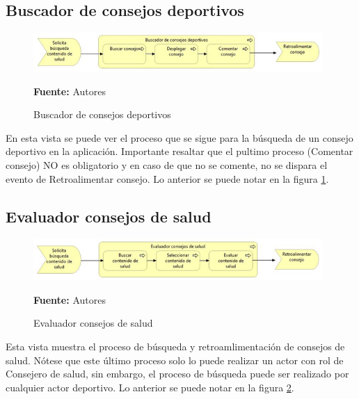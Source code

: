 \subsection{Buscador de consejos deportivos}

\begin{figure}[!htb]
  \begin{center}
    \includegraphics[width=11cm]{./imagenes/Archimate/vistas/business_process/buscadorconsejosdeportivos.png}
    \caption{Buscador de consejos deportivos}
    \label{fig:BP_BuscadorConsejosDeportivos}
    \textbf{Fuente:}  Autores \\
  \end{center}
\end{figure}

En esta vista se puede ver el proceso que se sigue para la búsqueda de un consejo deportivo en la aplicación. Importante resaltar que el pultimo proceso (Comentar consejo) NO es obligatorio y en caso de que no se comente, no se dispara el evento de Retroalimentar consejo. Lo anterior se puede notar en la figura \ref{fig:BP_BuscadorConsejosDeportivos}.

\subsection{Evaluador consejos de salud}

\begin{figure}[!htb]
  \begin{center}
    \includegraphics[width=11cm]{./imagenes/Archimate/vistas/business_process/evaluadorconsejossalud.png}
    \caption{Evaluador consejos de salud}
    \label{fig:BP_EvaluadorConsejosSalud}
    \textbf{Fuente:}  Autores \\
  \end{center}
\end{figure}

Esta vista muestra el proceso de búsqueda y retroamlimentación de consejos de salud. Nótese que este último proceso solo lo puede realizar un actor con rol de Consejero de salud, sin embargo, el proceso de búsqueda puede ser realizado por cualquier actor deportivo. Lo anterior se puede notar en la figura \ref{fig:BP_EvaluadorConsejosSalud}.

